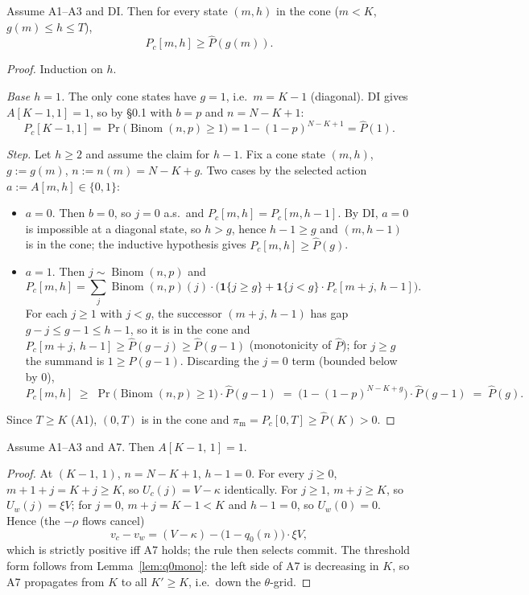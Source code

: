 \begin{lemma}\label{lem:cone}
Assume A1--A3 and DI. Then for every state $(m,h)$ in the cone ($m < K$, $g(m) \le h \le T$),
\[
P_c[m,h] \ge \widehat P(g(m)).
\]
\end{lemma}

\begin{proof}
Induction on $h$.

\emph{Base $h = 1$.} The only cone states have $g = 1$, i.e.\ $m = K-1$ (diagonal). DI gives $A[K-1, 1] = 1$, so by \S 0.1 with $b = p$ and $n = N-K+1$:
\[
P_c[K-1, 1] = \Pr\bigl(\operatorname{Binom}(n,p) \ge 1\bigr) = 1 - (1-p)^{N-K+1} = \widehat P(1).
\]

\emph{Step.} Let $h \ge 2$ and assume the claim for $h-1$. Fix a cone state $(m,h)$, $g := g(m)$, $n := n(m) = N-K+g$. Two cases by the selected action $a := A[m,h] \in \{0,1\}$:
\begin{itemize}
\item $a = 0$. Then $b = 0$, so $j = 0$ a.s.\ and $P_c[m,h] = P_c[m,h-1]$. By DI, $a = 0$ is impossible at a diagonal state, so $h > g$, hence $h-1 \ge g$ and $(m,h-1)$ is in the cone; the inductive hypothesis gives $P_c[m,h] \ge \widehat P(g)$.
\item $a = 1$. Then $j \sim \operatorname{Binom}(n,p)$ and
\[
P_c[m,h] = \sum_j \operatorname{Binom}(n,p)(j) \cdot \bigl( \mathbf{1}\{j \ge g\} + \mathbf{1}\{j < g\} \cdot P_c[m+j,\, h-1] \bigr).
\]
For each $j \ge 1$ with $j < g$, the successor $(m+j,\, h-1)$ has gap $g-j \le g-1 \le h-1$, so it is in the cone and $P_c[m+j,\, h-1] \ge \widehat P(g-j) \ge \widehat P(g-1)$ (monotonicity of $\widehat P$); for $j \ge g$ the summand is $1 \ge \widehat P(g-1)$. Discarding the $j = 0$ term (bounded below by $0$),
\[
P_c[m,h] \;\ge\; \Pr\bigl(\operatorname{Binom}(n,p) \ge 1\bigr) \cdot \widehat P(g-1)
\;=\; \bigl(1 - (1-p)^{N-K+g}\bigr) \cdot \widehat P(g-1) \;=\; \widehat P(g).
\]
\end{itemize}
Since $T \ge K$ (A1), $(0,T)$ is in the cone and $\pi_{\mathrm{m}} = P_c[0,T] \ge \widehat P(K) > 0$.
\end{proof}

\begin{lemma}\label{lem:deadline}
Assume A1--A3 and A7. Then $A[K-1,\, 1] = 1$.
\end{lemma}

\begin{proof}
At $(K-1,\, 1)$, $n = N-K+1$, $h-1 = 0$. For every $j \ge 0$, $m+1+j = K+j \ge K$, so $U_c(j) = V - \kappa$ identically. For $j \ge 1$, $m+j \ge K$, so $U_w(j) = \xi V$; for $j = 0$, $m+j = K-1 < K$ and $h-1 = 0$, so $U_w(0) = 0$. Hence (the $-\rho$ flows cancel)
\[
v_c - v_w = (V - \kappa) - \bigl(1 - q_0(n)\bigr) \cdot \xi V,
\]
which is strictly positive iff A7 holds; the rule then selects commit. The threshold form follows from Lemma~\ref{lem:q0mono}: the left side of A7 is decreasing in $K$, so A7 propagates from $K$ to all $K' \ge K$, i.e.\ down the $\theta$-grid.
\end{proof}

